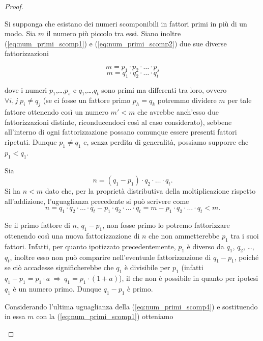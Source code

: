 \begin{proof}
\begin{enumerate}
Si supponga che esistano dei numeri scomponibili in fattori primi in più di un modo. Sia $m$ il numero più piccolo tra essi. Siano inoltre (\ref{eq:num_primi_scomp1}) e (\ref{eq:num_primi_scomp2}) due sue diverse fattorizzazioni

\begin{equation}\label{eq:num_primi_scomp1}
m = p_1 \cdot p_2 \cdot \ldots \cdot p_s
\end{equation}
\begin{equation}\label{eq:num_primi_scomp2}
m = q_1 \cdot q_2 \cdot \ldots \cdot q_t
\end{equation}

\noindent dove i numeri $p_1$,\ldots,$p_s$ e $q_1$,\ldots,$q_t$ sono primi ma differenti tra loro, ovvero $\forall i,j \; p_i \neq q_j$ (se ci fosse un fattore primo $p_h=q_k$ potremmo dividere $m$ per tale fattore ottenendo così un numero $m' < m$ che avrebbe anch'esso due fattorizzazioni distinte, riconducendoci così al caso considerato), sebbene all'interno di ogni fattorizzazione possano comunque essere presenti fattori ripetuti.
Dunque $p_1\neq q_1$ e, senza perdita di generalità, possiamo supporre che $p_1 < q_1$.

Sia
\begin{equation}\label{eq:num_primi_scomp3}
n = (q_1-p_1)\cdot q_2 \cdot \ldots \cdot q_t.
\end{equation}
Si ha $n < m$ dato che, per la proprietà distributiva della moltiplicazione rispetto all'addizione, l'uguaglianza precedente si può scrivere come
\begin{equation}\label{eq:num_primi_scomp4}
n = q_1\cdot q_2\cdot \ldots \cdot q_t - p_1\cdot q_2\cdot \ldots\cdot q_t = m - p_1\cdot q_2\cdot \ldots \cdot q_t < m.
\end{equation}

Se il primo fattore di $n$, $q_1-p_1$, non fosse primo lo potremo fattorizzare ottenendo così una nuova fattorizzazione di $n$ che non ammetterebbe $p_1$ tra i suoi fattori. Infatti, per quanto ipotizzato precedentemente, $p_1$ è diverso da $q_1$, $q_2$, \ldots, $q_t$, inoltre esso non può comparire nell'eventuale fattorizzazione di $q_1-p_1$, poiché se ciò accadesse significherebbe che $q_1$ è divisibile per $p_1$ (infatti $q_1-p_1= p_1\cdot a \:\Rightarrow\: q_1 = p_1\cdot(1+a)$), il che non è possibile in quanto per ipotesi $q_1$ è un numero primo. Dunque $q_1-p_1$ è primo.

Considerando l'ultima uguaglianza della (\ref{eq:num_primi_scomp4}) e sostituendo in essa $m$ con la (\ref{eq:num_primi_scomp1}) otteniamo


\end{enumerate}
\end{proof}
